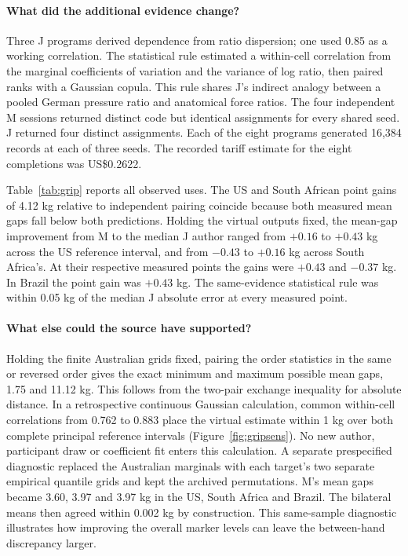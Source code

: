 \paragraph{What did the additional evidence change?}
Three J programs derived dependence from ratio dispersion; one used 0.85 as a working correlation. The statistical rule estimated a within-cell correlation from the marginal coefficients of variation and the variance of log ratio, then paired ranks with a Gaussian copula. This rule shares J's indirect analogy between a pooled German pressure ratio and anatomical force ratios. The four independent M sessions returned distinct code but identical assignments for every shared seed. J returned four distinct assignments. Each of the eight programs generated 16,384 records at each of three seeds. The recorded tariff estimate for the eight completions was US\$0.2622.

Table~\ref{tab:grip} reports all observed uses. The US and South African point gains of 4.12 kg relative to independent pairing coincide because both measured mean gaps fall below both predictions. Holding the virtual outputs fixed, the mean-gap improvement from M to the median J author ranged from $+0.16$ to $+0.43$ kg across the US reference interval, and from $-0.43$ to $+0.16$ kg across South Africa's. At their respective measured points the gains were $+0.43$ and $-0.37$ kg. In Brazil the point gain was $+0.43$ kg. The same-evidence statistical rule was within 0.05 kg of the median J absolute error at every measured point.

\paragraph{What else could the source have supported?}
Holding the finite Australian grids fixed, pairing the order statistics in the same or reversed order gives the exact minimum and maximum possible mean gaps, 1.75 and 11.12 kg. This follows from the two-pair exchange inequality for absolute distance. In a retrospective continuous Gaussian calculation, common within-cell correlations from 0.762 to 0.883 place the virtual estimate within 1 kg over both complete principal reference intervals (Figure~\ref{fig:gripsens}). No new author, participant draw or coefficient fit enters this calculation. A separate prespecified diagnostic replaced the Australian marginals with each target's two separate empirical quantile grids and kept the archived permutations. M's mean gaps became 3.60, 3.97 and 3.97 kg in the US, South Africa and Brazil. The bilateral means then agreed within 0.002 kg by construction. This same-sample diagnostic illustrates how improving the overall marker levels can leave the between-hand discrepancy larger.

